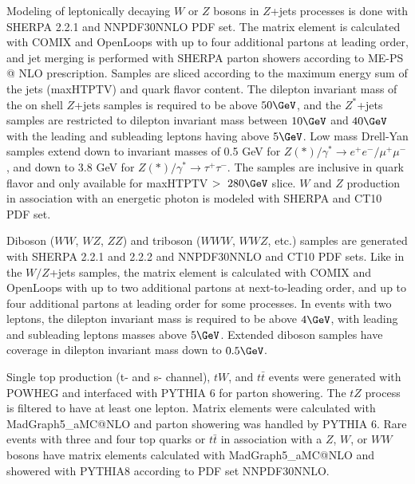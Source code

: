  Modeling of leptonically decaying $W$ or $Z$ bosons in $Z$+jets processes is done with SHERPA 2.2.1 and NNPDF30NNLO PDF set.  The matrix element is calculated with COMIX \cite{comix} and OpenLoops \cite{loop} with up to four additional partons at leading order, and jet merging is performed with SHERPA parton showers according to ME-PS @ NLO prescription.  Samples are sliced according to the maximum energy sum of the jets (maxHTPTV) and quark flavor content.  The dilepton invariant mass of the on shell $Z$+jets samples is required to be above $50\GeV$, and the $Z^*$+jets samples are restricted to dilepton invariant mass between $10\GeV$ and $40\GeV$ with the leading and subleading leptons having \pt above $5\GeV$.  Low mass Drell-Yan samples extend down to invariant masses of 0.5 GeV for $Z{(*)}/\gamma^* \rightarrow e^+e^-/\mu^+\mu^-$, and down to 3.8 GeV for $Z{(*)}/\gamma^* \rightarrow \tau^+\tau^-$.  The samples are inclusive in quark flavor and only available for maxHTPTV $>~280\GeV$ slice.  $W$ and $Z$ production in association with an energetic photon is modeled with SHERPA and CT10 PDF set. %
 
Diboson ($WW$, $WZ$, $ZZ$) and triboson ($WWW$, $WWZ$, etc.) samples are generated with SHERPA 2.2.1 and 2.2.2 and NNPDF30NNLO and CT10 PDF sets.  Like in the $W/Z$+jets samples, the matrix element is calculated with COMIX and OpenLoops with up to two additional partons at next-to-leading order, and up to four additional partons at leading order for some processes.  In events with two leptons, the dilepton invariant mass is required to be above $4\GeV$, with leading and subleading leptons masses above $5\GeV$.  Extended diboson samples have coverage in dilepton invariant mass down to $0.5\GeV$.    
 
 Single top production (t- and s- channel), $tW$, and $t\bar{t}$ events were generated with POWHEG and interfaced with PYTHIA 6 for parton showering.  The $tZ$ process is filtered to have at least one lepton.  Matrix elements were calculated with MadGraph5\_aMC@NLO and parton showering was handled by PYTHIA 6.  Rare events with three and four top quarks or $t\bar{t}$ in association with a $Z$, $W$, or $WW$ bosons have matrix elements calculated with MadGraph5\_aMC@NLO and showered with PYTHIA8 according to PDF set NNPDF30NNLO.
 
